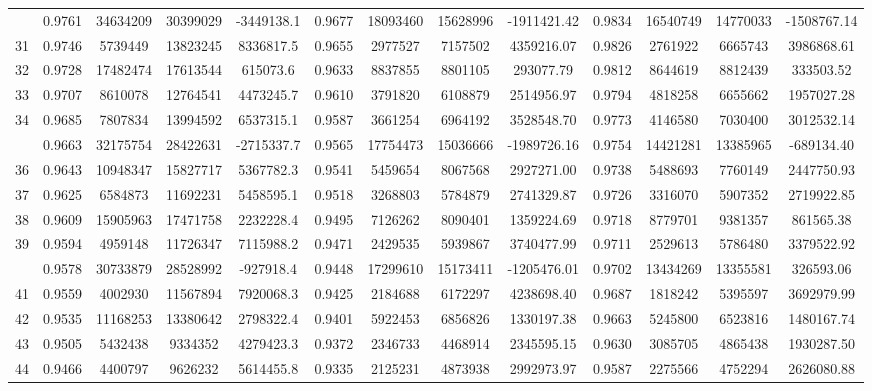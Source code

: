 \documentclass[
  12pt,
]{article}
\begin{document}
\begin{longtable}[t]{lcccccccccccc}
\addlinespace
30 & 0.9761 & 34634209 & 30399029 & -3449138.1 & 0.9677 & 18093460 & 15628996 & -1911421.42 & 0.9834 & 16540749 & 14770033 & -1508767.14\\
31 & 0.9746 & 5739449 & 13823245 & 8336817.5 & 0.9655 & 2977527 & 7157502 & 4359216.07 & 0.9826 & 2761922 & 6665743 & 3986868.61\\
32 & 0.9728 & 17482474 & 17613544 & 615073.6 & 0.9633 & 8837855 & 8801105 & 293077.79 & 0.9812 & 8644619 & 8812439 & 333503.52\\
33 & 0.9707 & 8610078 & 12764541 & 4473245.7 & 0.9610 & 3791820 & 6108879 & 2514956.97 & 0.9794 & 4818258 & 6655662 & 1957027.28\\
34 & 0.9685 & 7807834 & 13994592 & 6537315.1 & 0.9587 & 3661254 & 6964192 & 3528548.70 & 0.9773 & 4146580 & 7030400 & 3012532.14\\
\addlinespace
35 & 0.9663 & 32175754 & 28422631 & -2715337.7 & 0.9565 & 17754473 & 15036666 & -1989726.16 & 0.9754 & 14421281 & 13385965 & -689134.40\\
36 & 0.9643 & 10948347 & 15827717 & 5367782.3 & 0.9541 & 5459654 & 8067568 & 2927271.00 & 0.9738 & 5488693 & 7760149 & 2447750.93\\
37 & 0.9625 & 6584873 & 11692231 & 5458595.1 & 0.9518 & 3268803 & 5784879 & 2741329.87 & 0.9726 & 3316070 & 5907352 & 2719922.85\\
38 & 0.9609 & 15905963 & 17471758 & 2232228.4 & 0.9495 & 7126262 & 8090401 & 1359224.69 & 0.9718 & 8779701 & 9381357 & 861565.38\\
39 & 0.9594 & 4959148 & 11726347 & 7115988.2 & 0.9471 & 2429535 & 5939867 & 3740477.99 & 0.9711 & 2529613 & 5786480 & 3379522.92\\
\addlinespace
40 & 0.9578 & 30733879 & 28528992 & -927918.4 & 0.9448 & 17299610 & 15173411 & -1205476.01 & 0.9702 & 13434269 & 13355581 & 326593.06\\
41 & 0.9559 & 4002930 & 11567894 & 7920068.3 & 0.9425 & 2184688 & 6172297 & 4238698.40 & 0.9687 & 1818242 & 5395597 & 3692979.99\\
42 & 0.9535 & 11168253 & 13380642 & 2798322.4 & 0.9401 & 5922453 & 6856826 & 1330197.38 & 0.9663 & 5245800 & 6523816 & 1480167.74\\
43 & 0.9505 & 5432438 & 9334352 & 4279423.3 & 0.9372 & 2346733 & 4468914 & 2345595.15 & 0.9630 & 3085705 & 4865438 & 1930287.50\\
44 & 0.9466 & 4400797 & 9626232 & 5614455.8 & 0.9335 & 2125231 & 4873938 & 2992973.97 & 0.9587 & 2275566 & 4752294 & 2626080.88\\

\end{longtable}
\end{document}
